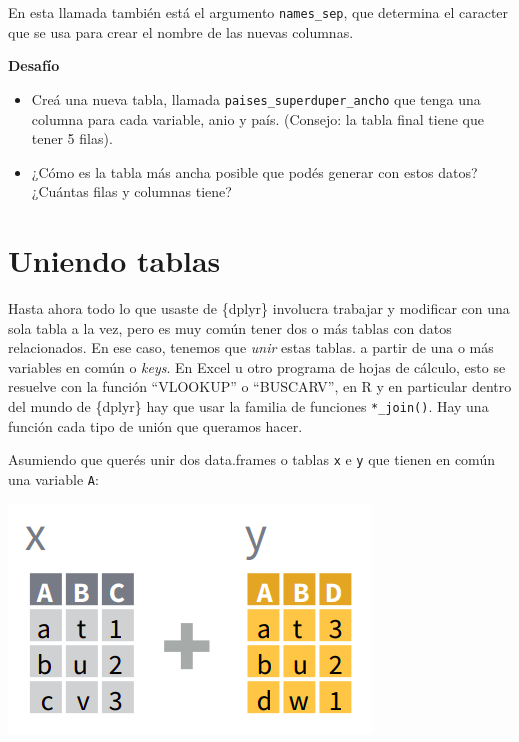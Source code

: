 \documentclass[
  openany]{book}
\begin{document}
En esta llamada también está el argumento \texttt{names\_sep}, que determina el caracter que se usa para crear el nombre de las nuevas columnas.

\textbf{Desafío}

\begin{itemize}
\item
  Creá una nueva tabla, llamada \texttt{paises\_superduper\_ancho} que tenga una columna para cada variable, anio y país.
  (Consejo: la tabla final tiene que tener 5 filas).
\item
  ¿Cómo es la tabla más ancha posible que podés generar con estos datos?
  ¿Cuántas filas y columnas tiene?
\end{itemize}

\hypertarget{uniendo-tablas-1}{%
\section{Uniendo tablas}\label{uniendo-tablas-1}}

Hasta ahora todo lo que usaste de \{dplyr\} involucra trabajar y modificar con una sola tabla a la vez, pero es muy común tener dos o más tablas con datos relacionados.
En ese caso, tenemos que \emph{unir} estas tablas.
a partir de una o más variables en común o \emph{keys}.
En Excel u otro programa de hojas de cálculo, esto se resuelve con la función ``VLOOKUP'' o ``BUSCARV'', en R y en particular dentro del mundo de \{dplyr\} hay que usar la familia de funciones \texttt{*\_join()}.
Hay una función cada tipo de unión que queramos hacer.

Asumiendo que querés unir dos data.frames o tablas \texttt{x} e \texttt{y} que tienen en común una variable \texttt{A}:

\includegraphics{img/join.png}
\end{document}
